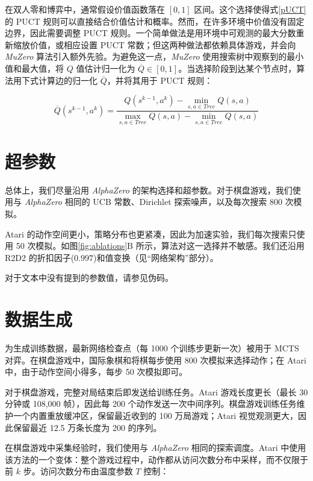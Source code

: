 \documentclass{article}
\newcommand{\muzero}{\emph{MuZero}}
\newcommand{\alphazero}{\emph{AlphaZero}}
\begin{document}
\begin{appendices}
在双人零和博弈中，通常假设价值函数落在 $[0, 1]$ 区间。这个选择使得式\ref{pUCT} 的 PUCT 规则可以直接结合价值估计和概率。然而，在许多环境中价值没有固定边界，因此需要调整 PUCT 规则。一个简单做法是用环境中可观测的最大分数重新缩放价值，或相应设置 PUCT 常数\cite{MCTS_single_agent}；但这两种做法都依赖具体游戏，并会向 \muzero{} 算法引入额外先验。为避免这一点，\muzero{} 使用搜索树中观察到的最小值和最大值，将 $Q$ 值估计归一化为 $\overline{Q} \in [0, 1]$。当选择阶段到达某个节点时，算法用下式计算边的归一化 $\overline{Q}$，并将其用于 PUCT 规则：

\begin{equation}
\overline{Q}(s^{k-1}, a^k) = \frac{Q(s^{k-1}, a^k) - \min_{s, a \in Tree}Q(s, a)}{\max_{s,a \in Tree} Q(s, a) - \min_{s,a \in Tree} Q(s, a)}
\end{equation}

\section{超参数}

总体上，我们尽量沿用 \alphazero{}\cite{Silver18AZ} 的架构选择和超参数。对于棋盘游戏，我们使用与 \alphazero{} 相同的 UCB 常数、Dirichlet 探索噪声，以及每次搜索 800 次模拟。

Atari 的动作空间更小，策略分布也更紧凑，因此为加速实验，我们每次搜索只使用 50 次模拟。如图\ref{fig:ablations}B 所示，算法对这一选择并不敏感。我们还沿用 R2D2\cite{r2d2} 的折扣因子($0.997$)和值变换（见“网络架构”部分）。

对于文本中没有提到的参数值，请参见伪码。

\section{数据生成}

为生成训练数据，最新网络检查点（每 1000 个训练步更新一次）被用于 MCTS 对弈。在棋盘游戏中，国际象棋和将棋每步使用 800 次模拟来选择动作；在 Atari 中，由于动作空间小得多，每步 50 次模拟即可。

对于棋盘游戏，完整对局结束后即发送给训练任务。Atari 游戏长度更长（最长 30 分钟或 108,000 帧），因此每 200 个动作发送一次中间序列。棋盘游戏训练任务维护一个内置重放缓冲区，保留最近收到的 100 万局游戏；Atari 视觉观测更大，因此保留最近 12.5 万条长度为 200 的序列。

在棋盘游戏中采集经验时，我们使用与 \alphazero{}\cite{Silver18AZ} 相同的探索调度。Atari 中使用该方法的一个变体：整个游戏过程中，动作都从访问次数分布中采样，而不仅限于前 $k$ 步。访问次数分布由温度参数 $T$ 控制：


\end{appendices}
\end{document}
